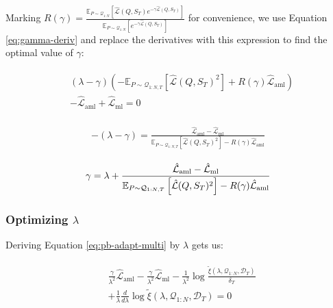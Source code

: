 \documentclass[letterpaper]{article} %
\theoremstyle{definition}
\newcommand{\Expect}[2]{\mathbb{E}_{#1}\left [#2 \right ]}
\begin{document}
Marking $R(\gamma)=\frac{\Expect{P\sim \mathcal{Q}_{1:N}}{\hat{\mathcal{L}}(Q,S_T)e^{-\gamma\hat{\mathcal{L}}(Q,S_T)} }}{\Expect{P\sim \mathcal{Q}_{1:N}}{e^{-\gamma\hat{\mathcal{L}}(Q,S_T)}} }$ for convenience, we use Equation \ref{eq:gamma-deriv} and replace the derivatives with this expression to find the optimal value of $\gamma$: 

\begin{align*} 
\begin{split}
&(\lambda-\gamma)\left (-\Expect{P\sim \mathcal{Q}_{1:N,T}}{\hat{\mathcal{L}}(Q,S_T)^2}+R(\gamma)\hat{\mathcal{L}}_{\mathrm{aml}}\right )\\& - \hat{\mathcal{L}}_{\mathrm{aml}}+\hat{\mathcal{L}}_{\mathrm{ml}} = 0
\end{split}
\end{align*}

\begin{align*} 
\begin{split}
-(\lambda-\gamma) = \frac{\hat{\mathcal{L}}_{\mathrm{aml}}-\hat{\mathcal{L}}_{\mathrm{ml}}}{\Expect{P\sim \mathcal{Q}_{1:N,T}}{\hat{\mathcal{L}}(Q,S_T)^2}-R(\gamma)\hat{\mathcal{L}}_{\mathrm{aml}}}
\end{split}
\end{align*}

\begin{align} \label{eq:meta-pb-gamma}
\begin{split}
\gamma = \lambda+\frac{\hat{\mathcal{L}}_{\mathrm{aml}}-\hat{\mathcal{L}}_{\mathrm{ml}}}{\Expect{P\sim \mathcal{Q}_{1:N,T}}{\hat{\mathcal{L}}(Q,S_T)^2}-R(\gamma)\hat{\mathcal{L}}_{\mathrm{aml}}}
\end{split}\hfill
\end{align}

\subsubsection{Optimizing $\lambda$}

Deriving Equation \ref{eq:pb-adapt-multi} by $\lambda$ gets us:

\begin{align*} 
\begin{split}
&\frac{\gamma}{\lambda^2} \hat{\mathcal{L}}_{\mathrm{aml}}-\frac{\gamma}{\lambda^2}\hat{\mathcal{L}}_{\mathrm{ml}}
-\frac{1}{\lambda^2}\log\frac{\tilde{\xi}(\lambda,\mathcal{Q}_{1:N},\mathcal{D}_T)}{\delta_T}\\
&+\frac{1}{\lambda}\frac{d}{d\lambda}\log\tilde{\xi}(\lambda,\mathcal{Q}_{1:N},\mathcal{D}_T)=0
\end{split}
\end{align*}
\end{document}
